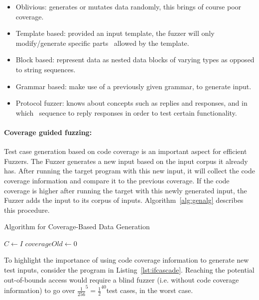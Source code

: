 \begin{itemize}
    \item Oblivious: generates or mutates data randomly, this brings of course poor coverage.
    \item Template based: provided an input template, the fuzzer will only modify/generate specific parts \
    allowed by the template.
    \item Block based: represent data as nested data blocks of varying types as opposed to string sequences.
    \item Grammar based: make use of a previously given grammar, to generate input.
    \item Protocol fuzzer: knows about concepts such as replies and responses, and in which \
    sequence to reply responses in order to test certain functionality.
\end{itemize}

\paragraph{Coverage guided fuzzing:}

Test case generation based on code coverage is an important aspect for efficient Fuzzers.
The Fuzzer generates a new input based on the input corpus it already has. After
running the target program with this new input, it will collect the code coverage
information and compare it to the previous coverage. If the code coverage is higher after
running the target with this newly generated input, the Fuzzer adds the input to its corpus of inputs.
Algorithm~\ref{alg:genalg} describes this procedure.

\SetAlgoVlined
\begin{algorithm}[h]
  \caption{Algorithm for Coverage-Based Data Generation}\label{alg:genalg}\LinesNumberedHidden\DontPrintSemicolon
  \KwOut{An Input Corpus $C$, such that $I \subseteq C$}
  $C \gets I$\;
  $coverageOld \gets 0$\;
\end{algorithm}

To highlight the importance of using code coverage information to generate new test inputs, consider the program in
Listing~\ref{lst:ifcascade}. Reaching the potential out-of-bounds access would require a blind fuzzer (i.e. without code coverage
information) to go over ${\frac{1}{256}}^{5} = {\frac{1}{2}}^{40}$test cases, in the worst case. %

